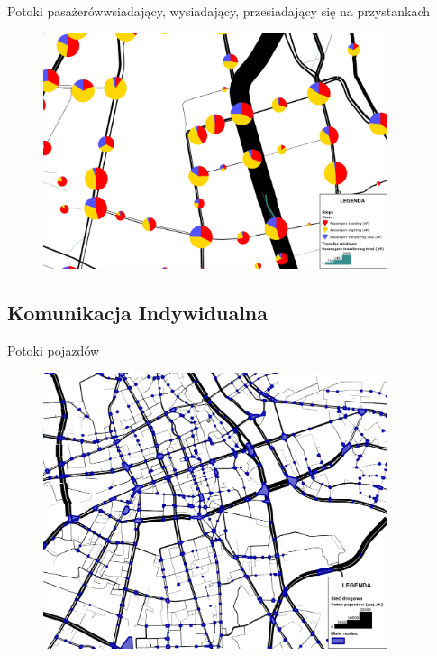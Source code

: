 \documentclass[8pt]{beamer}
\begin{document}
\begin{frame}{Potoki pasażerów}{wsiadający, wysiadający, przesiadający się na przystankach}
\begin{figure}\begin{center}
\includegraphics[width=0.9\textwidth]{stop_flows}
 \end{center}  \end{figure} 
\end{frame}


\subsection{Komunikacja Indywidualna}
\begin{frame}{Potoki pojazdów}
\begin{figure}\begin{center}
\includegraphics[width=0.9\textwidth]{prt_flows1}
 \end{center}  \end{figure} 
\end{frame}
\end{document}
